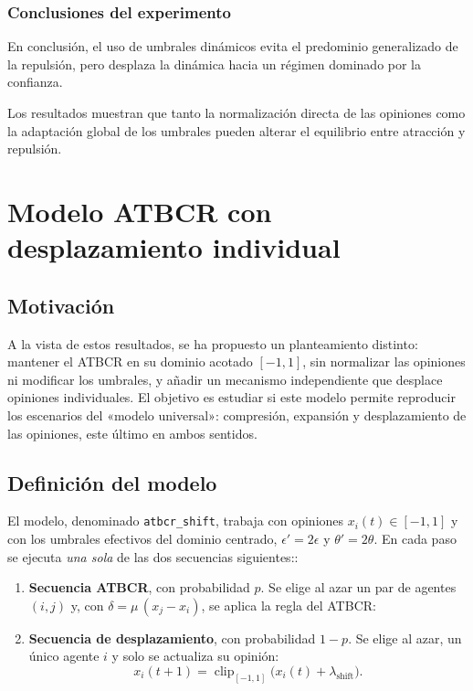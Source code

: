 \documentclass[11pt,a4paper]{article}
\begin{document}
\subsubsection{Conclusiones del experimento}
\label{subsec:exp07_conclusiones}

En conclusión, el uso de umbrales dinámicos evita el predominio generalizado de la repulsión, pero desplaza la dinámica hacia un régimen dominado por la confianza.

Los resultados muestran que tanto la normalización directa de las opiniones como la adaptación global de los umbrales pueden alterar el equilibrio entre atracción y repulsión.


\section{Modelo ATBCR con desplazamiento individual}
\label{sec:atbcr-shift}

\subsection{Motivación}
\label{sec:shift-motivacion}

A la vista de estos resultados, se ha propuesto un planteamiento distinto: mantener el ATBCR en su dominio acotado $[-1,1]$, sin normalizar las opiniones ni modificar los umbrales, y añadir un mecanismo independiente que desplace opiniones individuales. El objetivo es estudiar si este modelo permite reproducir los escenarios del «modelo universal»: compresión, expansión y desplazamiento de las opiniones, este último en ambos sentidos.

\subsection{Definición del modelo}
\label{sec:shift-definicion}

El modelo, denominado \texttt{atbcr\_shift}, trabaja con opiniones $x_i(t)\in[-1,1]$ y con los umbrales efectivos del dominio centrado, $\epsilon'=2\epsilon$ y $\theta'=2\theta$. En cada paso se ejecuta \emph{una sola} de las dos secuencias siguientes::

\begin{enumerate}
    \item \textbf{Secuencia ATBCR}, con probabilidad $p$. Se elige al azar un par de agentes $(i,j)$ y, con $\delta=\mu\,(x_j-x_i)$, se aplica la regla del ATBCR:
    \item \textbf{Secuencia de desplazamiento}, con probabilidad $1-p$. Se elige al azar, un único agente $i$ y solo se actualiza su opinión:
    \begin{equation}
    \label{eq:shift-desplazamiento}
    x_i(t+1)=\operatorname{clip}_{[-1,1]}\bigl(x_i(t)+\lambda_{\mathrm{shift}}\bigr).
    \end{equation}
\end{enumerate}
\end{document}
